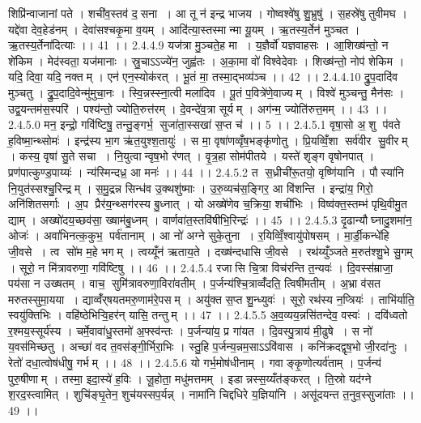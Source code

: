 शिप्रि॑न्वाजानां पते । शची॑व॒स्तव॑ द॒॒सना । आ तू न॑ इन्द्र भाजय । गोष्वश्वे॑षु शु॒भ्रुषु॑ । स॒हस्रे॑षु तुवीमघ । यद्दे॑वा देव॒हेड॑नम् । देवा॑सश्चकृ॒मा व॒यम् । आदि॑त्या॒स्तस्मान्मा यू॒यम् । ऋ॒तस्य॒र्तेन॑ मुञ्चत । ऋ॒तस्य॒र्तेना॑दित्याः ।। 41 ।।
2.4.4.9
यज॑त्रा मु॒ञ्चते॒ह मा । य॒ज्ञैर्वो॑ यज्ञवाहसः । आ॒शिख्ष॑न्तो॒ न शे॑किम । मेद॑स्वता॒ यज॑मानाः । स्रु॒चाऽऽज्ये॑न॒ जुह्व॑तः । अ॒का॒मा वो॑ विश्वेदेवाः । शिख्ष॑न्तो॒ नोप॑ शेकिम । यदि॒ दिवा॒ यदि॒ नक्तम् । एन॑ एन॒स्योक॑रत् । भू॒तं मा॒ तस्मा॒द्भव्य॑ञ्च ।। 42 ।।
2.4.4.10
द्रु॒प॒दादि॑व मुञ्चतु । द्रु॒प॒दादि॒वेन्मु॑मुचा॒नः । स्वि॒न्नस्स्ना॒त्वी मला॑दिव । पू॒तं प॒वित्रे॑णे॒वाज्यम् । विश्वे॑ मुञ्चन्तु॒ मैन॑सः । उद्व॒यन्तम॑स॒स्परि॑ । पश्य॑न्तो॒ ज्योति॒रुत्त॑रम् । दे॒वन्दे॑व॒त्रा सूर्यम् । अग॑न्म॒ ज्योति॑रुत्त॒मम् ।। 43 ।।
2.4.5.0
मन॒ इन्द्रो॒ गवि॑ष्टिषु॒ तन्तु॒ङ्गर्भ॒॒ सुजा॑ता॒स्सखा॑ स॒प्त च॑ ।। 5 ।।
2.4.5.1
वृषा॒सो अ॒॒शु प॑वते ह॒विष्मा॒न्थ्सोमः॑ । इन्द्र॑स्य भा॒ग ऋ॑त॒युश्श॒तायुः॑ । स मा॒ वृषा॑णव्वृँष॒भङ्कृ॑णोतु । प्रि॒यव्विँ॒शा सर्व॑वीर सु॒वीरम् । कस्य॒ वृषा॑ सु॒ते सचा । नि॒युत्वान्वृष॒भो र॑णत् । वृ॒त्र॒हा सोम॑पीतये । यस्ते॑ शृङ्ग वृषोनपात् । प्रण॑पात्कुण्ड॒पाय्यः॑ । न्य॑स्मिन्दध्र॒ आ मनः॑ ।। 44 ।।
2.4.5.2
त स॒ध्रीची॑रू॒तयो॒ वृष्णि॑यानि । पौस्या॑नि नि॒युत॑स्सश्चु॒रिन्द्रम् । स॒मु॒द्रन्न सिन्ध॑व उ॒क्थशु॑ष्माः । उ॒रु॒व्यच॑स॒ङ्गिर॒ आ वि॑शन्ति । इन्द्रा॑य॒ गिरो॒ अनि॑शितसर्गाः । अ॒प प्रैर॑य॒न्थ्सग॑रस्य बु॒ध्नात् । यो अख्षे॑णेव च॒क्रिया॒ शची॑भिः । विष्व॑क्त॒स्तम्भ॑ पृथि॒वीमु॒त द्याम् । अख्षो॑दय॒च्छव॑सा॒ ख्षाम॑बु॒ध्नम् । वार्णवा॑त॒स्तवि॑षीभि॒रिन्द्रः॑ ।। 45 ।।
2.4.5.3
दृ॒ढान्यौघ्नादु॒शमा॑न॒ ओजः॑ । अवा॑भिनत्क॒कुभ॒ पर्व॑तानाम् । आ नो॑ अग्ने सुके॒तुना । र॒यिव्विँ॒श्वायु॑पोषसम् । मा॒र्डी॒कन्धे॑हि जी॒वसे । त्व सो॑म म॒हे भगम् । त्वय्यूँन॑ ऋताय॒ते । दख्ष॑न्दधासि जी॒वसे । रथ॑य्युँञ्जते म॒रुत॑श्शु॒भे सु॒गम् । सूरो॒ न मि॑त्रावरुणा॒ गवि॑ष्टिषु ।। 46 ।।
2.4.5.4
रजा॑सि चि॒त्रा विच॑रन्ति त॒न्यवः॑ । दि॒वस्स॑म्राजा॒ पय॑सा न उख्षतम् । वाच॒॒ सुमि॑त्रावरुणा॒विरा॑वतीम् । प॒र्जन्य॑श्चि॒त्राव्वँ॑दति॒ त्विषी॑मतीम् । अ॒भ्रा व॑सत मरुतस्सुमा॒यया । द्याव्वँ॑र्‌षयतमरु॒णाम॑रे॒पसम् । अयु॑क्त स॒प्त शु॒न्ध्युवः॑ । सूरो॒ रथ॑स्य न॒प्त्रियः॑ । ताभि॑र्याति॒ स्वयु॑क्तिभिः । वहि॑ष्ठेभिऱ्वि॒हर॑न् यासि॒ तन्तुम् ।। 47 ।।
2.4.5.5
अ॒व॒व्यय॒न्नसि॑तन्देव॒ वस्वः॑ । दवि॑ध्वतो र॒श्मय॒स्सूर्य॑स्य । चर्मे॒वावा॑धु॒स्तमो॑ अ॒फ्स्व॑न्तः । प॒र्जन्या॑य॒ प्र गा॑यत । दि॒वस्पु॒त्राय॑ मी॒ढुषे । स नो॑ य॒वस॑मिच्छतु । अच्छा॑ वद त॒वस॑ङ्गी॒र्भिरा॒भिः । स्तु॒हि प॒र्जन्य॒न्नम॒साऽऽवि॑वास । कनि॑क्रदद्वृष॒भो जी॒रदा॑नुः । रेतो॑ दधा॒त्वोष॑धीषु॒ गर्भम् ।। 48 ।।
2.4.5.6
यो गर्भ॒मोष॑धीनाम् । गवाङ्कृ॒णोत्यर्व॑ताम् । प॒र्जन्य॑ पुरु॒षीणाम् । तस्मा॒ इदा॒स्ये॑ ह॒विः । जू॒होता॒ मधु॑मत्तमम् । इडान्नस्स॒य्यँत॑ङ्करत् । ति॒स्रो यद॑ग्ने श॒रद॒स्त्वामित् । शुचि॑ङ्घृ॒तेन॒ शुच॑यस्सप॒र्यन्न् । नामा॑नि चिद्दधिरे य॒ज्ञिया॑नि । असू॑दयन्त त॒नुव॒स्सुजा॑ताः ।। 49 ।।
